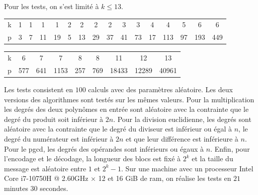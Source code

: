 \documentclass{article}
\theoremstyle{definition}
\theoremstyle{remark}
\begin{document}
\vspace{.5cm}

Pour les tests, on s'est limité à $k \le 13$.

\vspace{.5cm}

\begin{tabular}{c|ccccccccccccccc}
     k & 1 & 1 & 1 & 1 & 2 & 2 & 2 & 2 & 3 & 3 & 4 & 4 & 5 & 6 & 6 \\
     p & 3 & 7 & 11 & 19 & 5 & 13 & 29 & 37 & 41 & 73 & 17 & 113 & 97 & 193 & 449
\end{tabular}

\vspace{.3cm}

\begin{tabular}{c|cccccccc}
     k & 6 & 7 & 7 & 8 & 8 & 11 & 12 & 13 \\
     p & 577 & 641 & 1153 & 257 & 769 & 18433 & 12289 & 40961
\end{tabular}

\vspace{.5cm}

 Les tests consistent en $100$ calculs avec des paramètres aléatoire. Les deux versions des algorithmes sont testés sur les mêmes valeurs. Pour la multiplication les degrés des deux polynômes en entrée sont aléatoire avec la contrainte que le degré du produit soit inférieur à $2n$. Pour la division euclidienne, les degrés sont aléatoire avec la contrainte que le degré du diviseur est inférieur ou égal à $n$, le degré du numérateur est inférieur à $2n$ et que leur différence est inférieure à $n$. Pour le pgcd, les degrés des opérandes sont inférieurs ou égaux à $n$. Enfin, pour l'encodage et le décodage, la longueur des blocs est fixé à $2^k$ et la taille du message est aléatoire entre $1$ et $2^k-1$. Sur une machine avec un processeur Intel Core i7-10750H @ 2.60GHz × 12 et 16 GiB de ram, on réalise les tests en $21$ minutes $30$ secondes.
\end{document}

